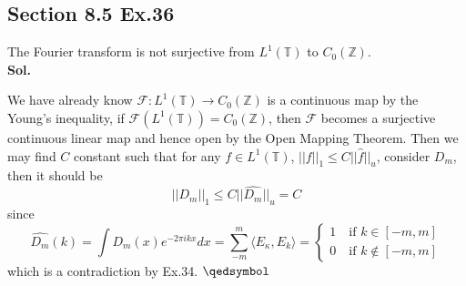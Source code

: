 \documentclass[lang=en,11pt,a4paper,citestyle =authoryear]{elegantpaper}
\newcommand{\prvd}{$\hfill \qedsymbol$}
\newcommand{\Z}{\mathbb{Z}}
\begin{document}
\subsection*{Section 8.5 Ex.36}
The Fourier transform is not surjective from $L^1(\mathbb{T})$ to $C_0(\Z)$.
\vspace{0.5em}\\
\textbf{Sol.} \par
    We have already know $\mathcal{F}:L^1(\mathbb{T}) \to C_0(\Z)$ is a continuous map by the Young's inequality, if $\mathcal{F}(L^1(\mathbb{T})) = C_0(\Z)$, then $\mathcal{F}$ becomes a surjective continuous linear map and hence open by the Open Mapping Theorem. Then we may find $C$ constant such that for any $f\in L^1(\mathbb{T})$, $||f||_1 \leq C||\hat{f}||_u$, consider $D_m$, then it should be
    \[
    ||D_m||_1 \leq C||\hat{D_m}||_u = C
    \]
    since
    \[
    \hat{D_m}(k) = \int D_m(x) e^{-2\pi i kx}dx = \sum_{-m}^m \langle E_{\kappa},E_k\rangle = \begin{cases}
    1\quad\text{if }k\in[-m,m] \\
    0\quad\text{if }k\notin[-m,m] 
    \end{cases}
    \]
    which is a contradiction by Ex.34.
\prvd
\end{document}
